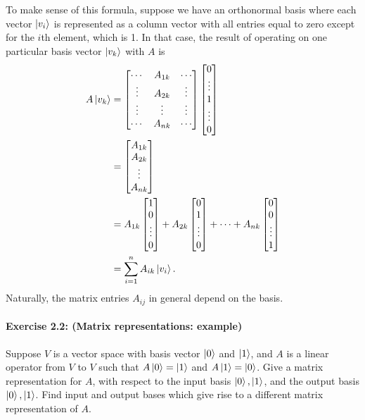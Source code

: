 To make sense of this formula, suppose we have an orthonormal basis where each
vector $\ket{v_i}$ is represented as a column vector with all entries equal to
zero except for the $i$th element, which is 1. In that case, the result of
operating on one particular basis vector $\ket{v_k}$ with $A$ is
\begin{align*}
  A\ket{v_k}
    &= \begin{bmatrix}
        \cdots & A_{1k} & \cdots \\
        \vdots & A_{2k} & \vdots \\
        \vdots & \vdots & \vdots \\
        \cdots & A_{nk} & \cdots
      \end{bmatrix} \begin{bmatrix}
        0 \\
        \vdots \\
        1 \\
        \vdots \\
        0
      \end{bmatrix} \\
    &= \begin{bmatrix}
        A_{1k} \\
        A_{2k} \\
        \vdots \\
        A_{nk}
      \end{bmatrix} \\
    &= A_{1k}\begin{bmatrix}1 \\ 0 \\ \vdots \\ 0\end{bmatrix}
      + A_{2k}\begin{bmatrix}0 \\ 1 \\ \vdots \\ 0\end{bmatrix}
      + \cdots
      + A_{nk}\begin{bmatrix}0 \\ 0 \\ \vdots \\ 1\end{bmatrix} \\
    &= \sum_{i=1}^n A_{ik}\ket{v_i}.
\end{align*}
Naturally, the matrix entries $A_{ij}$ in general depend on the basis.

\paragraph{\cite{mikeandike} Exercise 2.2: (Matrix representations: example)}
Suppose $V$ is a vector space with basis vector $\ket{0}$ and $\ket{1}$, and
$A$ is a linear operator from $V$ to $V$ such that $A\ket{0} = \ket{1}$ and
$A\ket{1} = \ket{0}$. Give a matrix representation for $A$, with respect to the
input basis $\ket{0}, \ket{1}$, and the output basis $\ket{0}, \ket{1}$. Find
input and output bases which give rise to a different matrix representation of
$A$.


